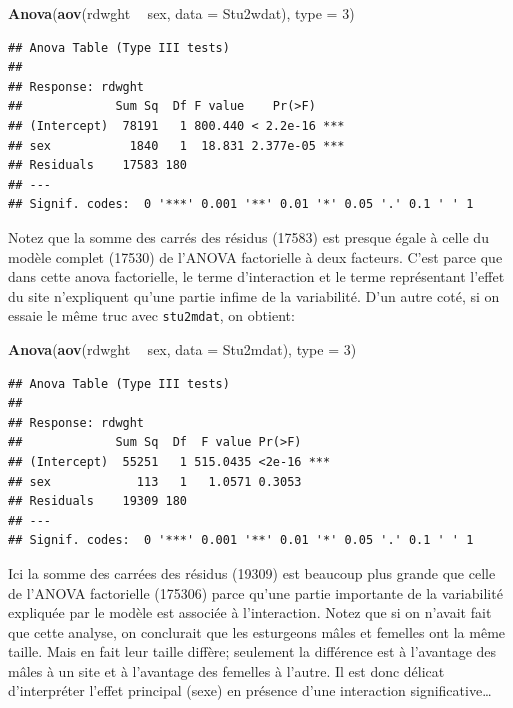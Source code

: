 \documentclass[12pt,]{book}
\newenvironment{Shaded}{\begin{snugshade}}{\end{snugshade}}
\newcommand{\DataTypeTok}[1]{\textcolor[rgb]{0.27,0.27,0.27}{#1}}
\newcommand{\DecValTok}[1]{\textcolor[rgb]{0.06,0.06,0.06}{#1}}
\newcommand{\KeywordTok}[1]{\textcolor[rgb]{0.27,0.27,0.27}{\textbf{#1}}}
\newcommand{\NormalTok}[1]{#1}
\newcommand{\OperatorTok}[1]{\textcolor[rgb]{0.43,0.43,0.43}{\textbf{#1}}}
\newcommand{\StringTok}[1]{\textcolor[rgb]{0.5,0.5,0.5}{#1}}
\begin{document}
\begin{Shaded}
\begin{Highlighting}[]
\KeywordTok{Anova}\NormalTok{(}\KeywordTok{aov}\NormalTok{(rdwght }\OperatorTok{~}\StringTok{ }\NormalTok{sex, }\DataTypeTok{data =}\NormalTok{ Stu2wdat), }\DataTypeTok{type =} \DecValTok{3}\NormalTok{)}
\end{Highlighting}
\end{Shaded}

\begin{verbatim}
## Anova Table (Type III tests)
## 
## Response: rdwght
##             Sum Sq  Df F value    Pr(>F)    
## (Intercept)  78191   1 800.440 < 2.2e-16 ***
## sex           1840   1  18.831 2.377e-05 ***
## Residuals    17583 180                      
## ---
## Signif. codes:  0 '***' 0.001 '**' 0.01 '*' 0.05 '.' 0.1 ' ' 1
\end{verbatim}

Notez que la somme des carrés des résidus (17583) est presque égale à celle du modèle complet (17530) de l'ANOVA factorielle à deux facteurs. C'est parce que dans cette anova factorielle, le terme d'interaction et le terme représentant l'effet du site n'expliquent qu'une partie infime de la variabilité. D'un autre coté, si on essaie le même truc avec \texttt{stu2mdat}, on obtient:

\begin{Shaded}
\begin{Highlighting}[]
\KeywordTok{Anova}\NormalTok{(}\KeywordTok{aov}\NormalTok{(rdwght }\OperatorTok{~}\StringTok{ }\NormalTok{sex, }\DataTypeTok{data =}\NormalTok{ Stu2mdat), }\DataTypeTok{type =} \DecValTok{3}\NormalTok{)}
\end{Highlighting}
\end{Shaded}

\begin{verbatim}
## Anova Table (Type III tests)
## 
## Response: rdwght
##             Sum Sq  Df  F value Pr(>F)    
## (Intercept)  55251   1 515.0435 <2e-16 ***
## sex            113   1   1.0571 0.3053    
## Residuals    19309 180                    
## ---
## Signif. codes:  0 '***' 0.001 '**' 0.01 '*' 0.05 '.' 0.1 ' ' 1
\end{verbatim}

Ici la somme des carrées des résidus (19309) est beaucoup plus grande que celle de l'ANOVA factorielle (175306) parce qu'une partie importante de la variabilité expliquée par le modèle est associée à l'interaction. Notez que si on n'avait fait que cette analyse, on conclurait que les esturgeons mâles et femelles ont la même taille. Mais en fait leur taille diffère; seulement la différence est à l'avantage des mâles à un site et à l'avantage des femelles à l'autre. Il est donc délicat d'interpréter l'effet principal (sexe) en présence d'une interaction significative\ldots{}
\end{document}
